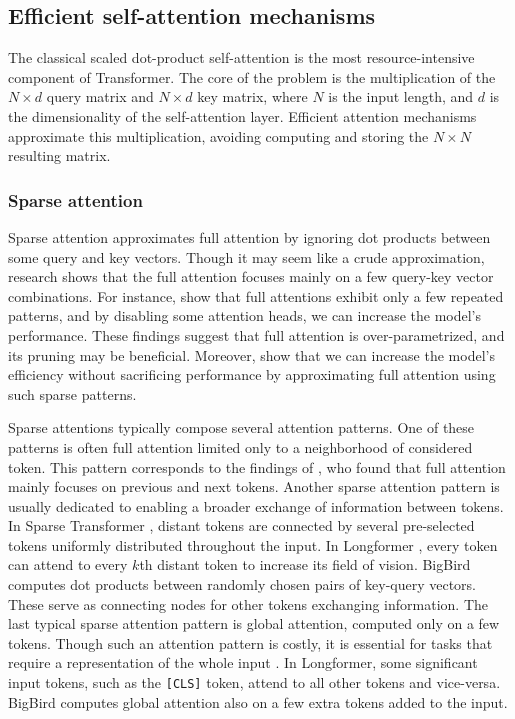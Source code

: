 \subsection{Efficient self-attention mechanisms}\label{section:efficient_self_attn}


The classical scaled dot-product self-attention \citep{vaswani2017attention} is
the most resource-intensive component of Transformer. The core of the
problem is the multiplication of the $N\times d$ query matrix and $N\times d$ key
matrix, where $N$ is the input length, and $d$ is the dimensionality of the
self-attention layer. Efficient attention mechanisms approximate this
multiplication, avoiding computing and storing the $N\times N$ resulting
matrix.

\subsubsection{Sparse attention}

Sparse attention approximates full attention by ignoring dot products between
some query and key vectors. Though it may seem like a crude approximation,
research shows that the full attention focuses mainly on a few query-key vector
combinations. For instance, \cite{kovaleva2019revealing} show that full
attentions exhibit only a few repeated patterns, and by disabling some attention
heads, we can increase the model's performance. These findings suggest that full
attention is over-parametrized, and its pruning may be beneficial. Moreover,
\cite{child2019generating} show that we can increase the model's efficiency without
sacrificing performance by approximating full attention using such sparse patterns.

Sparse attentions typically compose several attention patterns. One of these
patterns is often full attention limited only to a neighborhood of considered
token. This pattern corresponds to the findings of \cite{clark2019does}, who
found that full attention mainly focuses on previous and next tokens. Another
sparse attention pattern is usually dedicated to enabling a broader exchange of
information between tokens. In Sparse Transformer \citep{child2019generating},
distant tokens are connected by several pre-selected tokens uniformly
distributed throughout the input. In Longformer \citep{beltagy2020longformer},
every token can attend to every $k$th distant token to increase its field of
vision. BigBird \citep{zaheer2020big} computes dot products between randomly
chosen pairs of key-query vectors. These serve as connecting nodes for other
tokens exchanging information. The last typical sparse attention pattern is
global attention, computed only on a few tokens. Though such an attention
pattern is costly, it is essential for tasks that require a representation of
the whole input \citep{beltagy2020longformer}. In Longformer, some significant
input tokens, such as the \texttt{[CLS]} token, attend to all other tokens and
vice-versa. BigBird computes global attention also on a few extra tokens added
to the input.

